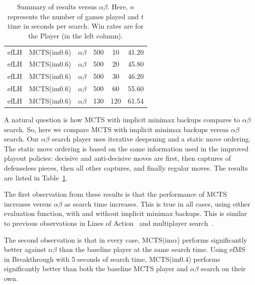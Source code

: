 \documentclass{article}
\begin{document}
\begin{table}[t!]
{\begin{center}
\begin{tabular}{ccccc|c}
efLH       & MCTS(im$0.6$)     & $\alpha\beta$    &  500   & 10      & 41.20      \\     
efLH       & MCTS(im$0.6$)     & $\alpha\beta$    &  500   & 20      & 45.80      \\     
efLH       & MCTS(im$0.6$)     & $\alpha\beta$    &  500   & 30      & 46.20      \\     
efLH       & MCTS(im$0.6$)     & $\alpha\beta$    &  500   & 60      & 55.60      \\     
efLH       & MCTS(im$0.6$)     & $\alpha\beta$    &  130   & 120     & 61.54      \\     
\hline
\end{tabular}
\end{center}
\caption{Summary of results versus $\alpha\beta$. 
Here, $n$ represents the number of games played and $t$ time in seconds per search.
Win rates are for the Player (in the left column).}
\label{tbl:ab_vs_mcts}
}
\end{table}

A natural question is how MCTS with implicit minimax backups compares to $\alpha\beta$ search. 
So, here we compare MCTS with implicit minimax backups versus $\alpha\beta$ search.
Our $\alpha\beta$ search player uses iterative deepening and a static move ordering. 
The static move ordering is based on the same information used in the improved playout
policies: decisive and anti-decisive moves are first, then captures of defenseless pieces, 
then all other captures, and finally regular moves.
The results are listed in Table~\ref{tbl:ab_vs_mcts}.

The first observation from these results is that the performance of MCTS increases versus 
$\alpha\beta$ as search time increases. This is true in all cases, using either evaluation function, 
with and without implicit minimax backups. This is similar to previous observations in 
Lines of Action~\cite{Winands11AB} and multiplayer search~\cite{Sturtevant08icga,Nijssen13}.

The second observation is that in every case, MCTS(im$\alpha$) performs significantly better 
against $\alpha\beta$ than the baseline player at the same search time. 
Using efMS in Breakthrough with 5 seconds of search time, MCTS(im$0.4$) performs significantly 
better than both the baseline MCTS player and $\alpha\beta$ search on their own. 
\end{document}
